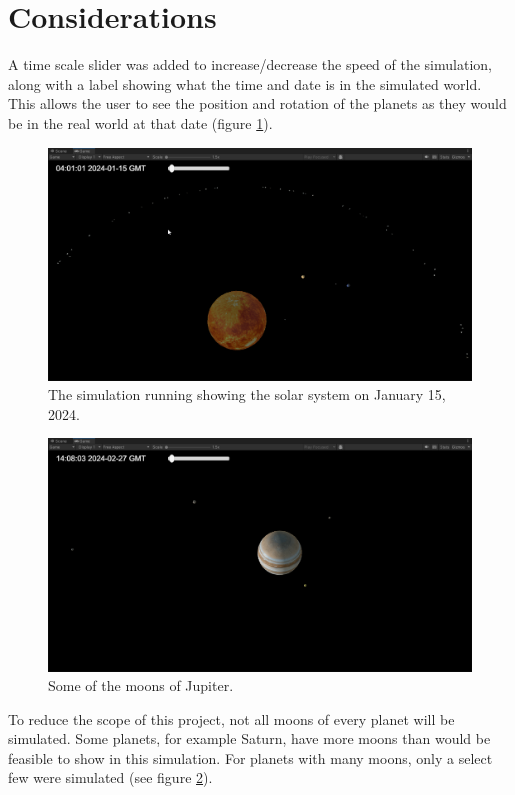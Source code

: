 \documentclass{article}
\begin{document}
    \section{Considerations}
    A time scale slider was added to increase/decrease the speed of the simulation, along with a label showing what the time and date is in the simulated world. This allows the user to see the position and rotation of the planets as they would be in the real world at that date (figure \ref{date}).
    \begin{figure}[h]
        \centering
        \includegraphics[scale=0.25]{date_time.png}
        \caption{The simulation running showing the solar system on January 15, 2024.}
        \label{date}
    \end{figure}
    \begin{figure}[h]
        \centering
        \includegraphics[scale=0.25]{jupiter.png}
        \caption{Some of the moons of Jupiter.}
        \label{jupiter}
    \end{figure}

    To reduce the scope of this project, not all moons of every planet will be simulated. Some planets, for example Saturn, have more moons than would be feasible to show in this simulation. For planets with many moons, only a select few were simulated (see figure \ref{jupiter}).
\end{document}
